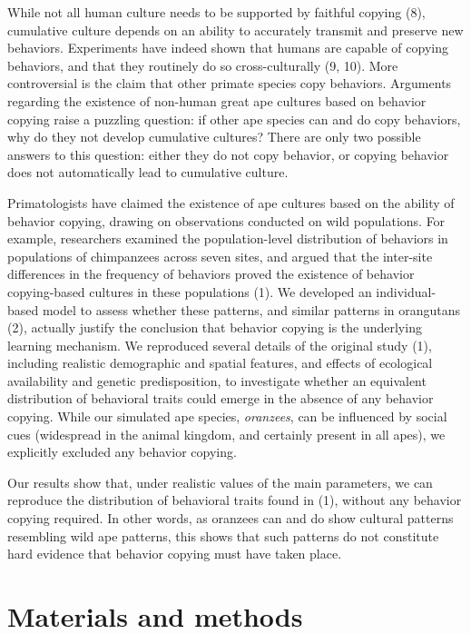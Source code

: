 \documentclass[9pt,twocolumn,twoside,]{pnas-new}
\begin{document}
While not all human culture needs to be supported by faithful copying
(8), cumulative culture depends on an ability to accurately transmit and
preserve new behaviors. Experiments have indeed shown that humans are
capable of copying behaviors, and that they routinely do so
cross-culturally (9, 10). More controversial is the claim that other
primate species copy behaviors. Arguments regarding the existence of
non-human great ape cultures based on behavior copying raise a puzzling
question: if other ape species can and do copy behaviors, why do they
not develop cumulative cultures? There are only two possible answers to
this question: either they do not copy behavior, or copying behavior
does not automatically lead to cumulative culture.

Primatologists have claimed the existence of ape cultures based on the
ability of behavior copying, drawing on observations conducted on wild
populations. For example, researchers examined the population-level
distribution of behaviors in populations of chimpanzees across seven
sites, and argued that the inter-site differences in the frequency of
behaviors proved the existence of behavior copying-based cultures in
these populations (1). We developed an individual-based model to assess
whether these patterns, and similar patterns in orangutans (2), actually
justify the conclusion that behavior copying is the underlying learning
mechanism. We reproduced several details of the original study (1),
including realistic demographic and spatial features, and effects of
ecological availability and genetic predisposition, to investigate
whether an equivalent distribution of behavioral traits could emerge in
the absence of any behavior copying. While our simulated ape species,
\emph{oranzees}, can be influenced by social cues (widespread in the
animal kingdom, and certainly present in all apes), we explicitly
excluded any behavior copying.

Our results show that, under realistic values of the main parameters, we
can reproduce the distribution of behavioral traits found in (1),
without any behavior copying required. In other words, as oranzees can
and do show cultural patterns resembling wild ape patterns, this shows
that such patterns do not constitute hard evidence that behavior copying
must have taken place.

\hypertarget{materials-and-methods}{%
\section*{Materials and methods}\label{materials-and-methods}}
\end{document}
